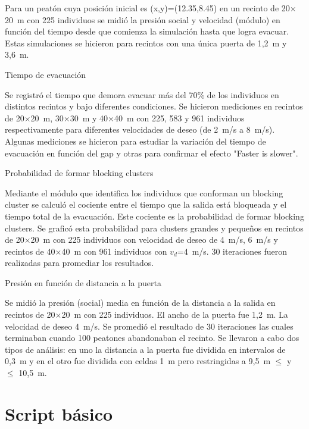 Para un peatón cuya posición inicial es (x,y)=(12.35,8.45) en un recinto de 20$\times$20~m con 225 individuos se midió la presión social y velocidad (módulo) en función del tiempo desde que comienza la simulación hasta que logra evacuar. Estas simulaciones se hicieron para recintos con una única puerta de 1,2~m y 3,6~m. 

{\Large Tiempo de evacuación}

Se registró el tiempo que demora evacuar más del 70\% de los individuos en distintos recintos y bajo diferentes condiciones. Se hicieron mediciones en recintos de 20$\times$20~m, 30$\times$30~m y 40$\times$40~m con 225, 583 y 961 individuos respectivamente para diferentes velocidades de deseo (de 2~m/s a 8~m/s). Algunas mediciones se hicieron para estudiar la variación del tiempo de evacuación en función del gap y otras para confirmar el efecto "Faster is slower". 

{\Large Probabilidad de formar blocking clusters}

Mediante el módulo que identifica los individuos que conforman un blocking cluster se calculó el cociente entre el tiempo que la salida está bloqueada y el tiempo total de la evacuación. Este cociente es la probabilidad de formar blocking clusters. Se graficó esta probabilidad para clusters grandes y pequeños en recintos de 20$\times$20~m con 225 individuos con velocidad de deseo de 4~m/s, 6~m/s y recintos de 40$\times$40~m con 961 individuos con $v_d$=4~m/s. 30 iteraciones fueron realizadas para promediar los resultados. 

{\Large Presión en función de distancia a la puerta}

Se midió la presión (social) media en función de la distancia a la salida en recintos de 20$\times$20~m con 225 individuos. El ancho de la puerta fue 1,2~m. La velocidad de deseo 4~m/s. Se promedió el resultado de 30 iteraciones las cuales terminaban cuando 100 peatones abandonaban el recinto. Se llevaron a cabo dos tipos de análisis: en uno la distancia a la puerta fue dividida en intervalos de 0,3~m y en el otro fue dividida con celdas 1~m pero restringidas a 9,5~m $\le$ y $\le$ 10,5~m. 


\section{Script básico}

